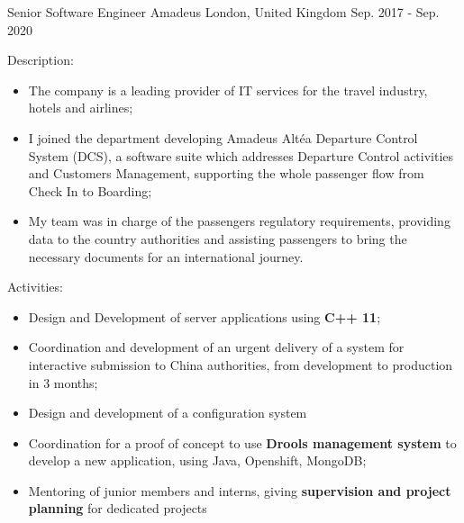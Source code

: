 \begin{cventries}
    \cventry
    {Senior Software Engineer} %
    {Amadeus} %
    {London,  United Kingdom} %
    {Sep. 2017 - Sep. 2020} %
    {
      \begin{cvitems} %
        \item[]{Description:
          \begin{itemize} %
              \item {The company is a leading provider of IT services for the travel industry, hotels and airlines;}
              \item {I joined the department developing Amadeus Altéa Departure
              Control System (DCS), a software suite which addresses Departure Control activities and
              Customers Management, supporting the whole passenger flow from Check In to Boarding;}
              \item {My team was in
              charge of the passengers regulatory requirements, providing data to the country authorities and assisting
              passengers to bring the necessary documents for an international journey.}
            \end{itemize}}
        \item[]{Activities:
          \begin{itemize}
            \item {Design and Development of server applications using \textbf{C++ 11};}
            \item {Coordination and development of an urgent delivery of a system for interactive submission to China authorities,
            from development to production in 3 months;}
            \item {Design and development of a configuration system}
            \item {Coordination for a proof of concept to use \textbf{Drools management
            system} to develop a new application, using Java, Openshift, MongoDB;}
            \item {Mentoring of junior members and interns, giving \textbf{supervision and project planning} for dedicated projects}
          \end{itemize}}
      \end{cvitems}
    }


\end{cventries}
